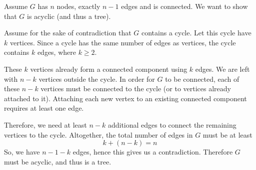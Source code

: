 \documentclass[12pt]{article}
\begin{document}
\begin{solution}
    \bbni
    
    Assume $G$ has $n$ nodes, exactly $n-1$ edges and is connected. We want to show that $G$ is acyclic (and thus a tree). 
    
    Assume for the sake of contradiction that $G$ contains a cycle. Let this cycle have $k$ vertices. Since a cycle has the same number of edges as vertices, the cycle contains $k$ edges, where $k \ge 2$.    
    
    These $k$ vertices already form a connected component using $k$ edges. We are left with $n-k$ vertices outside the cycle. In order for $G$ to be connected, each of these $n-k$ vertices must be connected to the cycle (or to vertices already attached to it). Attaching each new vertex to an existing connected component requires at least one edge.
    
    Therefore, we need at least $n-k$ additional edges to connect the remaining vertices to the cycle. Altogether, the total number of edges in $G$ must be at least
    \[k + (n-k) = n\]
    So, we have $n-1-k$ edges, hence this gives us a contradiction. Therefore $G$ must be acyclic, and thus is a tree.
\end{solution}
\end{document}
